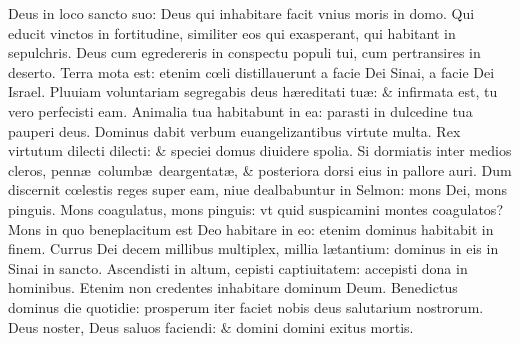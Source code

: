 \documentclass[a5paper,10pt]{book}
\def\ae{æ}
\def\oe{œ}
\begin{document}
\begin{multicols*}{2}
\newline \color{red} D\color{black}eus in loco sancto suo: Deus qui inhabitare facit vnius moris in domo.
\newline \color{red} Q\color{black}ui educit vinctos in fortitudine, similiter eos qui exasperant, qui habitant in sepulchris.
\newline \color{red} D\color{black}eus cum egredereris in conspectu populi tui, cum pertransires in deserto.
\newline \color{red} T\color{black}erra mota est: etenim c\oe li distillauerunt a facie Dei Sinai, a facie Dei Israel.
\newline \color{red} P\color{black}luuiam voluntariam segregabis deus h\ae reditati tu\ae : \& infirmata est, tu vero perfecisti eam.
\newline \color{red} A\color{black}nimalia tua habitabunt in ea: parasti in dulcedine tua pauperi deus.
\newline \color{red} D\color{black}ominus dabit verbum euangelizantibus virtute multa.
\newline \color{red} R\color{black}ex virtutum dilecti dilecti: \& speciei domus diuidere spolia.
\newline \color{red} S\color{black}i dormiatis inter medios cleros, penn\ae \ columb\ae \ deargentat\ae , \& posteriora dorsi eius in pallore auri.
\newline \color{red} D\color{black}um discernit c\oe lestis reges super eam, niue dealbabuntur in Selmon: mons Dei, mons pinguis.
\newline \color{red} M\color{black}ons coagulatus, mons pinguis: vt quid suspicamini montes coagulatos?
\newline \color{red} M\color{black}ons in quo beneplacitum est Deo habitare in eo: etenim dominus habitabit in finem.
\newline \color{red} C\color{black}urrus Dei decem millibus multiplex, millia l\ae tantium: dominus in eis in Sinai in sancto.%
\newline \color{red} A\color{black}scendisti in altum, cepisti captiuitatem: accepisti dona in hominibus.
\newline \color{red} E\color{black}tenim non credentes inhabitare dominum Deum.
\newline \color{red} B\color{black}enedictus dominus die quotidie: prosperum iter faciet nobis deus salutarium nostrorum.
\newline \color{red} D\color{black}eus noster, Deus saluos faciendi: \& domini domini exitus mortis.

\end{multicols*}
\end{document}
